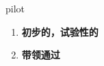 
\begin{frame}
{\huge pilot}
\begin{center}
\begin{enumerate}\Large
  \item \textbf{初步的，试验性的}
  \item \textbf{带领通过}
\end{enumerate}
\end{center}
\end{frame}
